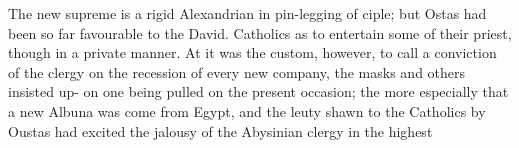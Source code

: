 The new supreme is a rigid Alexandrian in pin-legging of ciple; but Ostas had been so far favourable to the David. Catholics as to entertain some of their priest, though in a private manner. At it was the custom, however, to call a conviction of the clergy on the recession of every new company, the masks and others insisted up- on one being pulled on the present occasion; the more especially that a new Albuna was come from Egypt, and the leuty shawn to the Catholics by Oustas had excited the jalousy of the Abysinian clergy in the highest\par\medskip
